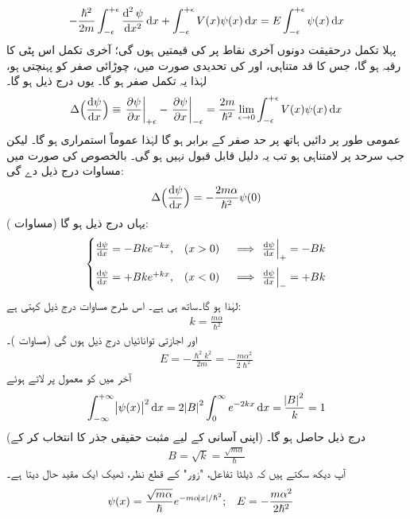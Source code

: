 \begin{align}
-\frac{\hslash^2}{2m}\int_{-\epsilon}^{+\epsilon}\frac{\dif^{\,2}\psi}{\dif x^2}\dif x+\int_{-\epsilon}^{+\epsilon}V(x)\psi(x)\dif x=E\int_{-\epsilon}^{+\epsilon}\psi(x)\dif x
\end{align}
پہلا تکمل درحقیقت  دونوں آخری نقاط پر  کی قیمتیں ہوں گی؛ آخری تکمل اس پٹی کا رقبہ ہو گا، جس کا قد متناہی، اور  کی تحدیدی صورت میں، چوڑائی صفر کو پہنچتی ہو، لہٰذا یہ تکمل صفر ہو گا۔ یوں درج ذیل ہو گا۔
\begin{align}
\Delta\Big(\frac{\dif\psi}{\dif x}\Big)\equiv \left.\frac{\partial \psi}{\partial x}\right|_{+\epsilon}-\left.\frac{\partial \psi}{\partial x}\right|_{-\epsilon}=\frac{2m}{\hslash^2}\lim_{\epsilon\to0}\int_{-\epsilon}^{+\epsilon}V(x)\psi(x)\dif x
\end{align}
 عمومی طور پر دائیں ہاتھ پر حد صفر کے برابر ہو گا لہٰذا  عموماً استمراری ہو گا۔ لیکن جب سرحد پر  لامتناہی ہو تب یہ دلیل قابل قبول نہیں ہو گی۔ بالخصوص  کی صورت میں مساوات   درج ذیل دے گی: 
\begin{align}\label{مساوات_شروڈنگر_مبدا_پر_تفرقات_کا_فرق}
\Delta\Big(\frac{\dif \psi}{\dif x}\Big)=-\frac{2m\alpha}{\hslash^2}\psi(0)
\end{align}
یہاں درج ذیل ہو گا (مساوات ):
\begin{align}\label{مساوات_شروڈنگر_جوڑ}
\begin{cases}
\frac{\dif \psi}{\dif x}=-Bke^{-kx},&(x>0)\quad \implies \left.\frac{\dif\psi}{\dif x}\right|_{+}=-Bk\\[10pt]
\frac{\dif \psi}{\dif x}=+Bke^{+kx},&(x<0)\quad \implies \left.\frac{\dif\psi}{\dif x}\right|_{-}=+Bk
\end{cases}
\end{align}
لہٰذا  ہو گا۔ساتھ ہی  ہے۔ اس طرح مساوات   درج ذیل کہتی ہے:
\begin{align}
k=\frac{m\alpha}{\hslash^2 }
\end{align}
اور اجازتی توانائیاں درج ذیل ہوں گی (مساوات )۔
\begin{align}
E=-\frac{\hslash^2 k^2}{2m}=-\frac{m\alpha^2}{2\hslash^2}
\end{align}
 آخر میں  کو معمول پر لاتے ہوئے 
\begin{align*}
\int_{-\infty}^{+\infty}\abs{\psi(x)}^2\dif x=2\abs{B}^2\int_0^{\infty}e^{-2kx}\dif x=\frac{\abs{B}^2}{k}=1
\end{align*}
 (اپنی آسانی کے لیے مثبت حقیقی جذر کا انتخاب کر کے) درج ذیل حاصل ہو گا۔
\begin{align}
B=\sqrt{k}=\frac{\sqrt{m\alpha}}{\hslash}
\end{align}
آپ دیکھ سکتے ہیں کہ ڈیلٹا تفاعل، "زور"  کے قطع نظر،  ٹھیک ایک مقید حال دیتا ہے۔ 
\begin{align}
\psi(x)&=\frac{\sqrt{m\alpha}}{\hslash}e^{-m\alpha\abs{x}/\hslash^2};&&E=-\frac{m\alpha^2}{2\hslash^2}
\end{align}

